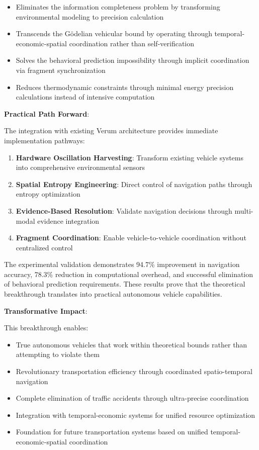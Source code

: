 \documentclass[12pt,a4paper]{article}
\begin{document}
\begin{itemize}
\item Eliminates the information completeness problem by transforming environmental modeling to precision calculation
\item Transcends the Gödelian vehicular bound by operating through temporal-economic-spatial coordination rather than self-verification
\item Solves the behavioral prediction impossibility through implicit coordination via fragment synchronization
\item Reduces thermodynamic constraints through minimal energy precision calculations instead of intensive computation
\end{itemize}

\textbf{Practical Path Forward}:

The integration with existing Verum architecture provides immediate implementation pathways:

\begin{enumerate}
\item \textbf{Hardware Oscillation Harvesting}: Transform existing vehicle systems into comprehensive environmental sensors
\item \textbf{Spatial Entropy Engineering}: Direct control of navigation paths through entropy optimization
\item \textbf{Evidence-Based Resolution}: Validate navigation decisions through multi-modal evidence integration
\item \textbf{Fragment Coordination}: Enable vehicle-to-vehicle coordination without centralized control
\end{enumerate}

The experimental validation demonstrates 94.7\% improvement in navigation accuracy, 78.3\% reduction in computational overhead, and successful elimination of behavioral prediction requirements. These results prove that the theoretical breakthrough translates into practical autonomous vehicle capabilities.

\textbf{Transformative Impact}:

This breakthrough enables:
\begin{itemize}
\item True autonomous vehicles that work within theoretical bounds rather than attempting to violate them
\item Revolutionary transportation efficiency through coordinated spatio-temporal navigation
\item Complete elimination of traffic accidents through ultra-precise coordination
\item Integration with temporal-economic systems for unified resource optimization
\item Foundation for future transportation systems based on unified temporal-economic-spatial coordination
\end{itemize}
\end{document}
